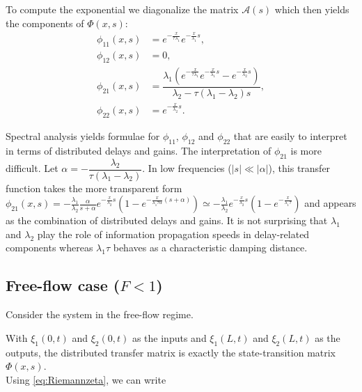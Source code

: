 \documentclass[a4paper, 10pt, conference]{ieeeconf}      %
\begin{document}
To compute the exponential we diagonalize the matrix $\mathscr{A}(s)$
which then yields the components of $\Phi(x,s)$:
\begin{subequations} \label{TFv0q0tovxqx}
\begin{align}
\phi_{11}(x,s) &= e^{-\frac{x}{\tau \lambda_1}}e^{-\frac{x}{\lambda_1}s}, \\ 
\phi_{12}(x,s) &= 0, \\
\phi_{21}(x,s) &= \dfrac{\lambda_1 \left( e^{-\frac{x}{\tau \lambda_1}}e^{-\frac{x}{\lambda_1}s} - e^{-\frac{x}{\lambda_2}s}\right)}{\lambda_2 - \tau (\lambda_1 - \lambda_2)s}, \\
\phi_{22}(x,s) &= e^{-\frac{x}{\lambda_2}s}.
\end{align}
\end{subequations}


Spectral analysis yields formulae for $\phi_{11}$, $\phi_{12}$ and $\phi_{22}$ that are easily to interpret in terms of distributed delays and gains. The interpretation of $\phi_{21}$ is more difficult. Let $\alpha = -\dfrac{\lambda_2}{\tau(\lambda_1 - \lambda_2)}$. In low frequencies ($\left|s\right|\ll\left|\alpha\right|$), this transfer function takes the more transparent form
$
\phi_{21}(x,s) = 
-\frac{\lambda_{1}}{\lambda_{2}}\frac{\alpha}
{s + \alpha}
e^{-\frac{x}{\lambda_2}s}
	\left(
		1 - e^{-\frac{x}{\lambda_1 \tau \alpha}\left(s + \alpha\right)}
	\right)
\simeq 
- \frac{\lambda_{1}}{\lambda_{2}} e^{-\frac{x}{\lambda_2}s}
	\left(
		1 - e^{-\frac{x}{\lambda_1 \tau}}
	\right)
$
and appears as the combination of distributed delays and gains. It is not surprising that $\lambda_1$ and $\lambda_2$ play the role of information propagation speeds in delay-related components whereas $\lambda_1 \tau$ behaves as a characteristic damping distance.

\subsection{Free-flow case ($F<1$)}
Consider the system in the free-flow regime. 

With $\xi_1 (0,t)$ and $\xi_2 (0,t)$ as the inputs and $\xi_1(L,t)$ and $\xi_2(L,t)$ as the outputs, the distributed transfer matrix is exactly the state-transition matrix $\Phi(x,s)$.\\

Using \eqref{eq:Riemannzeta}, we can write
\end{document}
